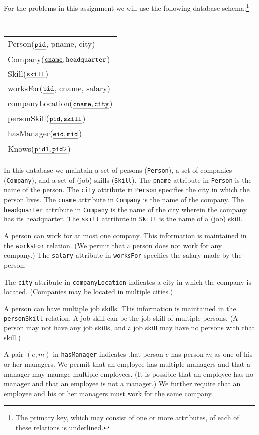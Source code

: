 \documentclass{article}
\begin{document}
For the problems in this assignment we will use the following database schema:\footnote{The primary key, which may consist of one or more attributes, of each of these relations is underlined.}

\begin{center}
{\tt
  \begin{tabular}{l}
  {Person}($\underline{\tt pid}$, pname, city) \\
  {Company}($\underline{\tt cname}, {\tt headquarter}$) \\
  {Skill}($\underline{\tt skill}$) \\
  {worksFor}($\underline{\tt pid}$, cname, salary) \\
  {companyLocation}($\underline{\tt cname, city}$) \\
  {personSkill}($\underline{\tt pid, skill}$) \\
  {hasManager}($\underline{\tt eid, mid}$) \\
  {Knows}($\underline{\tt pid1, pid2}$) \\
  \end{tabular}
  }
\end{center}

In this database we maintain a set of persons ({\tt Person}), a set
of companies ({\tt Company}), and a set of (job) skills ({\tt Skill}).  
The {\tt pname} attribute in {\tt Person} is the name of the person.  
The {\tt city} attribute in {\tt Person} specifies the city in which the person lives.  
The {\tt cname} attribute in {\tt Company} is the name of the company.
The {\tt headquarter} attribute in {\tt Company} is the name of the city wherein the company has its headquarter.
The {\tt skill} attribute in {\tt Skill} is the name of a (job) skill.

A person can work for at most one company. This information is maintained in the {\tt worksFor} relation. (We permit that a person does not work for any company.)
The {\tt salary} attribute in {\tt worksFor} specifies the salary made by the person.

The {\tt city} attribute in {\tt companyLocation} indicates a city in which the company is located.
(Companies may be located in multiple cities.)

A person can have multiple job skills. This information is maintained in the {\tt personSkill} relation.  A job skill can be
the job skill of multiple persons.  (A person may not have any job skills, and a job skill may
have no persons with that skill.)

A pair $(e,m)$ in {\tt hasManager} indicates that person $e$ has  
person $m$ as one of his or her managers.
We permit that an employee has multiple managers and that a manager  may manage
multiple employees.  (It is possible that an employee has no manager
and that an employee is not a manager.)
We further require that 
an employee and his or her managers must work for the
same company.
\end{document}
